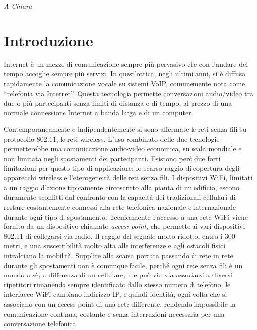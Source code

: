 \documentclass[12pt,a4paper,openright,twoside,draft]{book}
\begin{document}
%
%
\begin{titlepage}
  \thispagestyle{empty}
  \topmargin=6.5cm
  \raggedleft
  \large \em A Chiara
  \newpage
  \clearpage{\pagestyle{empty}\cleardoublepage}
\end{titlepage}



\chapter*{Introduzione}

Internet è un mezzo di comunicazione sempre più pervasivo che con
l'andare del tempo accoglie sempre più servizi. In quest'ottica, negli
ultimi anni, si è diffusa rapidamente la comunicazione vocale su
sistemi VoIP, comunemente nota come ``telefonia via Internet''. Questa
tecnologia permette conversazioni audio/video tra due o più
partecipanti senza limiti di distanza e di tempo, al prezzo di una
normale connessione Internet a banda larga e di un computer.

Contemporaneamente e indipendentemente si sono affermate le reti senza
fili su protocollo 802.11, le reti wireless. L'uso combinato delle due
tecnologie permetterebbe una comunicazione audio-video economica, su
scala mondiale e non limitata negli spostamenti dei
partecipanti. Esistono però due forti limitazioni per questo tipo di
applicazione: lo scarso raggio di copertura degli apparecchi wireless
e l'eterogeneità delle reti senza fili. I dispositivi WiFi, limitati a
un raggio d'azione tipicamente circoscritto alla pianta di un
edificio, escono duramente sconfitti dal confronto con la capacità dei
tradizionali cellulari di restare costantemente connessi alla rete
telefonica nazionale e internazionale durante ogni tipo di
spostamento. Tecnicamente l'accesso a una rete WiFi viene fornito da
un dispositivo chiamato \emph{access point}, che permette ai vari
dispositivi 802.11 di collegarsi via radio. Il raggio del segnale
molto ridotto, entro i 300 metri, e una suscettibilità molto alta alle
interferenze e agli ostacoli fisici intralciano la mobilità. Supplire
alla scarsa portata passando di rete in rete durante gli spostamenti
non è comunque facile, perché ogni rete senza fili è un mondo a sè; a
differenza di un cellulare, che può via via associarsi a diversi
ripetitori rimanendo sempre identificato dallo stesso numero di
telefono, le interfacce WiFi cambiano indirizzo IP, e quindi identità,
ogni volta che si associano con un access point di una rete
differente, rendendo impossibile la comunicazione continua, costante e
senza interruzioni necessaria per una conversazione telefonica.
\end{document}
